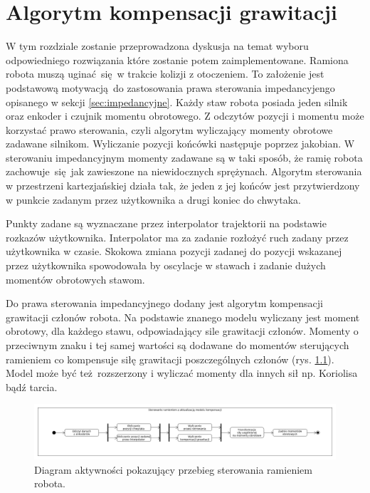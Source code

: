 
\chapter{Algorytm kompensacji grawitacji\label{chap:implementacja_systemu}}
W tym rozdziale zostanie przeprowadzona dyskusja na temat wyboru odpowiedniego rozwiązania które zostanie potem zaimplementowane. Ramiona robota muszą uginać się w trakcie kolizji z otoczeniem. To założenie jest podstawową motywacją do zastosowania prawa sterowania impedancyjengo opisanego w sekcji \ref{sec:impedancyjne}. Każdy staw robota posiada jeden silnik oraz enkoder i czujnik momentu obrotowego. Z odczytów pozycji i momentu może korzystać prawo sterowania, czyli algorytm wyliczający momenty obrotowe zadawane silnikom. Wyliczanie pozycji końcówki następuje poprzez jakobian. W sterowaniu impedancyjnym momenty zadawane są w taki sposób, że ramię robota zachowuje się jak zawieszone na niewidocznych sprężynach. Algorytm sterowania w przestrzeni kartezjańskiej działa tak, że jeden z jej końców jest przytwierdzony w punkcie zadanym przez użytkownika a drugi koniec do chwytaka. 

Punkty zadane są wyznaczane przez interpolator trajektorii na podstawie rozkazów użytkownika. Interpolator ma za zadanie rozłożyć ruch zadany przez użytkownika w czasie. Skokowa zmiana pozycji zadanej do pozycji wskazanej przez użytkownika spowodowała by oscylacje w stawach i zadanie dużych momentów obrotowych stawom.

Do prawa sterowania impedancyjnego dodany jest algorytm kompensacji grawitacji członów robota. Na podstawie znanego modelu wyliczany jest moment obrotowy, dla każdego stawu, odpowiadający sile grawitacji członów. Momenty o przeciwnym znaku i tej samej wartości są dodawane do momentów sterujących ramieniem co kompensuje siłę grawitacji poszczególnych członów (rys. \ref{fig:sterowanie}). Model może być też rozszerzony i wyliczać momenty dla innych sił np. Koriolisa bądź tarcia.

\begin{figure}
	\centering
	\includegraphics[width=.99\textwidth]{images/kompensacja.png}
	\caption{Diagram aktywności pokazujący przebieg sterowania ramieniem robota.}
	\label{fig:sterowanie}
\end{figure}

